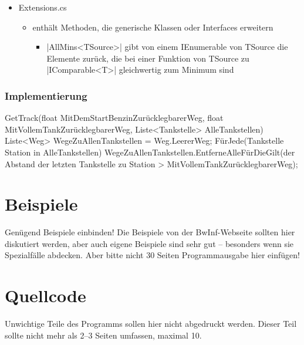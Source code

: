 \documentclass[a4paper,10pt,ngerman]{scrartcl}
\begin{document}
\begin{itemize}
    \item Extensions.cs
    \begin{itemize}
        \item enthält Methoden, die generische Klassen oder Interfaces erweitern
        \begin{itemize}
            \item |AllMins<TSource>| gibt von einem IEnumerable von TSource die Elemente zurück, die bei einer Funktion von TSource zu |IComparable<T>| gleichwertig zum Minimum sind
        \end{itemize}
    \end{itemize}
\end{itemize}

\subsubsection{Implementierung}
\begin{lstcs}
GetTrack(float MitDemStartBenzinZurücklegbarerWeg, float MitVollemTankZurücklegbarerWeg, Liste<Tankstelle> AlleTankstellen)
{
	Liste<Weg> WegeZuAllenTankstellen = Weg.LeererWeg;
	FürJede(Tankstelle Station in AlleTankstellen)
	{
		WegeZuAllenTankstellen.EntferneAlleFürDieGilt(der Abstand der letzten Tankstelle zu Station > MitVollemTankZurücklegbarerWeg);
	}
}
\end{lstcs}
\section{Beispiele}

Genügend Beispiele einbinden! Die Beispiele von der BwInf-Webseite sollten hier diskutiert werden, aber auch eigene Beispiele sind sehr gut – besonders wenn sie Spezialfälle abdecken. Aber bitte nicht 30 Seiten Programmausgabe hier einfügen!

\section{Quellcode}
Unwichtige Teile des Programms sollen hier nicht abgedruckt werden. Dieser Teil sollte nicht mehr als 2–3 Seiten umfassen, maximal 10.
\end{document}
